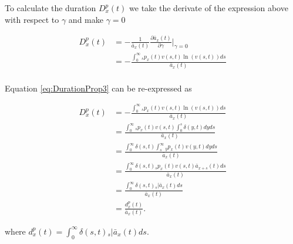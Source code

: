 \documentclass[12pt]{article}
\begin{document}
To calculate the duration ${D}^{p}_{x}(t)$ we take the derivate of the expression above with respect to $\gamma$ and make $\gamma=0$

\begin{equation}\label{eq:DurationProp3}
\begin{split}
{D}^{p}_{x}(t)&=-\frac{1}{\bar{a}_x(t)}\frac{\partial \bar{a}_x(t)}{\partial \gamma} \bigg\rvert_{\gamma=0} \\
&= -\frac{\int_0^\infty {}_sp_x(t) v(s,t) \ln(v(s,t))ds}{\bar{a}_x(t)} \\
\end{split}
\end{equation}


Equation \ref{eq:DurationProp3} can be re-expressed as 


\begin{equation}\label{eq:DurationProp4}
\begin{split}
{D}^{p}_{x}(t) &= -\frac{\int_0^\infty {}_sp_x(t) v(s,t) \ln(v(s,t))ds}{\bar{a}_x(t)}\\
&= \frac{\int_0^\infty {}_sp_x(t) v(s,t) \int_0^{s} \delta(y,t)dy ds }{\bar{a}_x(t)}\\
&= \frac{\int_0^\infty \delta(s,t)  \int_{s}^{\infty} {}_{y}p_x(t) v(y,t)dy ds }{\bar{a}_x(t)}\\
&= \frac{\int_0^\infty \delta(s,t) {}_sp_x(t) v(s,t) \bar{a}_{x+s}(t)  ds }{\bar{a}_x(t)}\\
&= \frac{\int_0^\infty \delta(s,t) {}_s|\bar{a}_x(t) ds}{\bar{a}_x(t)} \\
&= \frac{{d}^{p}_{x}(t)}{\bar{a}_x(t)}.
\end{split}
\end{equation}



where ${d}^{p}_{x}(t)=\int_0^\infty \delta(s,t) {}_s|\bar{a}_x(t) ds$.
\end{document}
